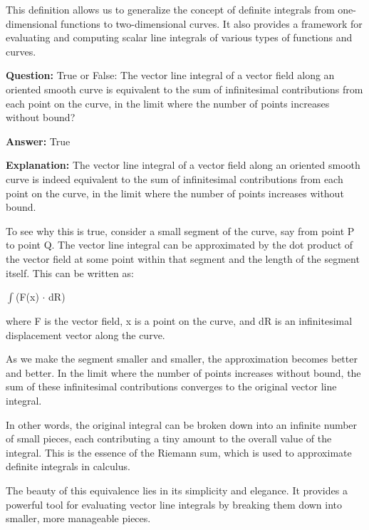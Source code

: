 \documentclass{article}
\begin{document}
This definition allows us to generalize the concept of definite integrals from one-dimensional functions to two-dimensional curves. It also provides a framework for evaluating and computing scalar line integrals of various types of functions and curves.
                
                \vspace{0.5cm} 
        
            
                \textbf {Question:} True or False: The vector line integral of a vector field along an oriented smooth curve is equivalent to the sum of infinitesimal contributions from each point on the curve, in the limit where the number of points increases without bound?
                
                \textbf{Answer:} True

                \textbf{Explanation:} The vector line integral of a vector field along an oriented smooth curve is indeed equivalent to the sum of infinitesimal contributions from each point on the curve, in the limit where the number of points increases without bound.

To see why this is true, consider a small segment of the curve, say from point P to point Q. The vector line integral can be approximated by the dot product of the vector field at some point within that segment and the length of the segment itself. This can be written as:

\ensuremath{\int}(F(x) \ensuremath{\cdot} dR)

where F is the vector field, x is a point on the curve, and dR is an infinitesimal displacement vector along the curve.

As we make the segment smaller and smaller, the approximation becomes better and better. In the limit where the number of points increases without bound, the sum of these infinitesimal contributions converges to the original vector line integral.

In other words, the original integral can be broken down into an infinite number of small pieces, each contributing a tiny amount to the overall value of the integral. This is the essence of the Riemann sum, which is used to approximate definite integrals in calculus.

The beauty of this equivalence lies in its simplicity and elegance. It provides a powerful tool for evaluating vector line integrals by breaking them down into smaller, more manageable pieces.
                
                \vspace{0.5cm} 
        
\end{document}

